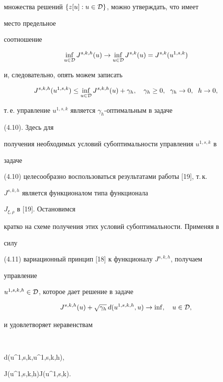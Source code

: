 множества решений $\{z[u]:u\in\cal D\}$, можно утверждать, что имеет 


место предельное 


соотношение 


$$ 


\inf_{u\in\cal D}J^{s,k,h}(u)\to\inf_{u\in\cal D} 


J^{s,k}(u)=J^{s,k}(u^{1,s,k}) 


$$ 


и, следовательно, опять можем записать 


\begin{equation} 


J^{s,k,h}(u^{1,s,k})\le\inf_{u\in\cal D}J^{s,k,h}(u)+ 


\gamma_h,\quad \gamma_h\ge0,\ \; \gamma_h\to0,\ \; h\to0, 


\end{equation} 


т.\,е. управление $u^{1,s,k}$ является $\gamma_h$-оптимальным в задаче 


(4.10). Здесь для 


получения необходимых условий субоптимальности управления $u^{1,s,k}$ в 


задаче 


(4.10) целесообразно воспользоваться результатами работы [19], т.\,к. 


$J^{s,k,h}$ является функционалом типа функционала 


$J_{\xi,\rho}$ в [19]. Остановимся 


кратко на схеме получения этих условий субоптимальности. Применяя в 


силу 


(4.11) вариационный принцип [18] к функционалу $J^{s,k,h}$, получаем 


управление 


$u^{1,s,k,h}\in\cal D$, которое дает решение в задаче 


\begin{equation} 


J^{s,k,h}(u)+\sqrt{\gamma_h}\,d(u^{1,s,k,h},u) 


\to\inf,\quad u\in\cal D, 


\end{equation} 


и удовлетворяет неравенствам 


$$ 


d(u^{1,s,k},u^{1,s,k,h})\le{},\quad 


J(u^{1,s,k,h})\le J(u^{1,s,k}). 


